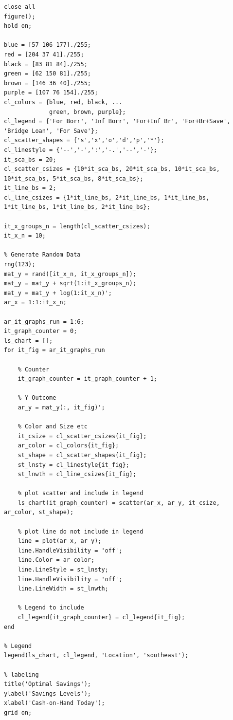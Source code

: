 \documentclass[
]{book}
\begin{document}
\begin{verbatim}
close all
figure();
hold on;

blue = [57 106 177]./255;
red = [204 37 41]./255;
black = [83 81 84]./255;
green = [62 150 81]./255;
brown = [146 36 40]./255;
purple = [107 76 154]./255;
cl_colors = {blue, red, black, ...
             green, brown, purple};
cl_legend = {'For Borr', 'Inf Borr', 'For+Inf Br', 'For+Br+Save', 'Bridge Loan', 'For Save'};
cl_scatter_shapes = {'s','x','o','d','p','*'};
cl_linestyle = {'--','-',':','-.','--','-'};
it_sca_bs = 20;
cl_scatter_csizes = {10*it_sca_bs, 20*it_sca_bs, 10*it_sca_bs, 10*it_sca_bs, 5*it_sca_bs, 8*it_sca_bs};
it_line_bs = 2;
cl_line_csizes = {1*it_line_bs, 2*it_line_bs, 1*it_line_bs, 1*it_line_bs, 1*it_line_bs, 2*it_line_bs};

it_x_groups_n = length(cl_scatter_csizes);
it_x_n = 10;

% Generate Random Data
rng(123);
mat_y = rand([it_x_n, it_x_groups_n]);
mat_y = mat_y + sqrt(1:it_x_groups_n);
mat_y = mat_y + log(1:it_x_n)';
ar_x = 1:1:it_x_n;

ar_it_graphs_run = 1:6;
it_graph_counter = 0;
ls_chart = [];
for it_fig = ar_it_graphs_run

    % Counter
    it_graph_counter = it_graph_counter + 1;

    % Y Outcome
    ar_y = mat_y(:, it_fig)';

    % Color and Size etc
    it_csize = cl_scatter_csizes{it_fig};
    ar_color = cl_colors{it_fig};
    st_shape = cl_scatter_shapes{it_fig};
    st_lnsty = cl_linestyle{it_fig};
    st_lnwth = cl_line_csizes{it_fig};
    
    % plot scatter and include in legend
    ls_chart(it_graph_counter) = scatter(ar_x, ar_y, it_csize, ar_color, st_shape);

    % plot line do not include in legend
    line = plot(ar_x, ar_y);
    line.HandleVisibility = 'off';
    line.Color = ar_color;
    line.LineStyle = st_lnsty;
    line.HandleVisibility = 'off';
    line.LineWidth = st_lnwth;

    % Legend to include
    cl_legend{it_graph_counter} = cl_legend{it_fig};
end

% Legend
legend(ls_chart, cl_legend, 'Location', 'southeast');

% labeling
title('Optimal Savings');
ylabel('Savings Levels');
xlabel('Cash-on-Hand Today');
grid on;
\end{verbatim}
\end{document}
